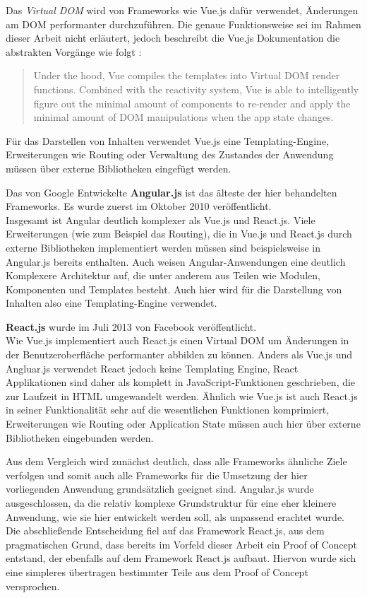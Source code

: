 Das \textit{Virtual DOM} wird von Frameworks wie Vue.js dafür verwendet, Änderungen am DOM performanter durchzuführen. Die genaue Funktionsweise sei im Rahmen dieser Arbeit nicht erläutert, jedoch beschreibt die Vue.js Dokumentation die abstrakten Vorgänge wie folgt \cite{VueTemplate}:

\begin{quote}
  Under the hood, Vue compiles the templates into Virtual DOM render functions. Combined with the reactivity system, Vue is able to intelligently figure out the minimal amount of components to re-render and apply the minimal amount of DOM manipulations when the app state changes.
\end{quote}

Für das Darstellen von Inhalten verwendet Vue.js eine Templating-Engine, Erweiterungen wie Routing oder Verwaltung des Zustandes der Anwendung müssen über externe Bibliotheken eingefügt werden.

Das von Google Entwickelte \textbf{Angular.js}\cite{angular} ist das älteste der hier behandelten Frameworks. Es wurde zuerst im Oktober 2010 veröffentlicht.\\
Insgesamt ist Angular deutlich komplexer als Vue.js und React.js. Viele Erweiterungen (wie zum Beispiel das Routing), die in Vue.js und React.js durch externe Bibliotheken implementiert werden müssen sind beispielsweise in Angular.js bereits enthalten.
Auch weisen Angular-Anwendungen eine deutlich Komplexere Architektur auf, die unter anderem aus Teilen wie Modulen, Komponenten und Templates besteht. Auch hier wird für die Darstellung von Inhalten also eine Templating-Engine verwendet.

\textbf{React.js}\cite{react} wurde im Juli 2013 von Facebook veröffentlicht.\\
Wie Vue.js implementiert auch React.js einen Virtual DOM um Änderungen in der Benutzeroberfläche performanter abbilden zu können.
Anders als Vue.js und Angluar.js verwendet React jedoch keine Templating Engine, React Applikationen sind daher als komplett in JavaScript-Funktionen geschrieben, die zur Laufzeit in HTML umgewandelt werden.
Ähnlich wie Vue.js ist auch React.js in seiner Funktionalität sehr auf die wesentlichen Funktionen komprimiert, Erweiterungen wie Routing oder Application State müssen auch hier über externe Bibliotheken eingebunden werden.

Aus dem Vergleich wird zunächst deutlich, dass alle Frameworks ähnliche Ziele verfolgen und somit auch alle Frameworks für die Umsetzung der hier vorliegenden Anwendung grundsätzlich geeignet sind.
Angular.js wurde ausgeschlossen, da die relativ komplexe Grundstruktur für eine eher kleinere Anwendung, wie sie hier entwickelt werden soll, als unpassend erachtet wurde.
Die abschließende Entscheidung fiel auf das Framework React.js, aus dem pragmatischen Grund, dass bereits im Vorfeld dieser Arbeit ein Proof of Concept entstand, der ebenfalls auf dem Framework React.js aufbaut. Hiervon wurde sich eine simpleres übertragen bestimmter Teile aus dem Proof of Concept versprochen.


